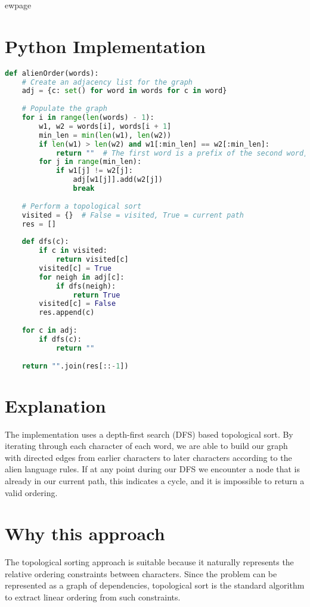 ewpage
\section*{Python Implementation}

\begin{fullwidth}
\begin{lstlisting}[language=Python]
def alienOrder(words):
    # Create an adjacency list for the graph
    adj = {c: set() for word in words for c in word}
    
    # Populate the graph
    for i in range(len(words) - 1):
        w1, w2 = words[i], words[i + 1]
        min_len = min(len(w1), len(w2))
        if len(w1) > len(w2) and w1[:min_len] == w2[:min_len]:
            return ""  # The first word is a prefix of the second word, but longer
        for j in range(min_len):
            if w1[j] != w2[j]:
                adj[w1[j]].add(w2[j])
                break
    
    # Perform a topological sort
    visited = {}  # False = visited, True = current path
    res = []
    
    def dfs(c):
        if c in visited:
            return visited[c]
        visited[c] = True
        for neigh in adj[c]:
            if dfs(neigh):
                return True
        visited[c] = False
        res.append(c)
    
    for c in adj:
        if dfs(c):
            return ""
    
    return "".join(res[::-1])
\end{lstlisting}

\end{fullwidth}

\section*{Explanation}
The implementation uses a depth-first search (DFS) based topological sort. By iterating through each character of each word, we are able to build our graph with directed edges from earlier characters to later characters according to the alien language rules. If at any point during our DFS we encounter a node that is already in our current path, this indicates a cycle, and it is impossible to return a valid ordering.

\section*{Why this approach}
The topological sorting approach is suitable because it naturally represents the relative ordering constraints between characters. Since the problem can be represented as a graph of dependencies, topological sort is the standard algorithm to extract linear ordering from such constraints.

